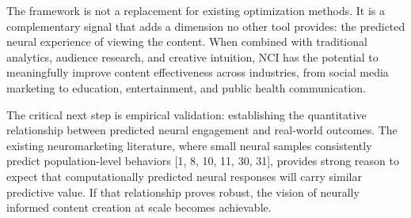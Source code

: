 \documentclass[11pt,letterpaper]{article}
\begin{document}
The framework is not a replacement for existing optimization methods. It is a complementary signal that adds a dimension no other tool provides: the predicted neural experience of viewing the content. When combined with traditional analytics, audience research, and creative intuition, NCI has the potential to meaningfully improve content effectiveness across industries, from social media marketing to education, entertainment, and public health communication.

The critical next step is empirical validation: establishing the quantitative relationship between predicted neural engagement and real-world outcomes. The existing neuromarketing literature, where small neural samples consistently predict population-level behaviors [1, 8, 10, 11, 30, 31], provides strong reason to expect that computationally predicted neural responses will carry similar predictive value. If that relationship proves robust, the vision of neurally informed content creation at scale becomes achievable.
\end{document}
